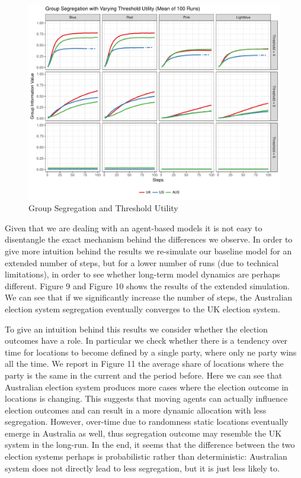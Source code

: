 \documentclass[12pt, a4paper]{article}
\begin{document}
	\begin{figure}[bp!]
		\centering
		\caption{Group Segregation and Threshold Utility}
		\includegraphics[scale=0.6]{./Plots/th_grp_ratios.pdf}
	\end{figure}
	
	Given that we are dealing with an agent-based models it is not easy to disentangle the exact mechanism behind the differences we observe. In order to give more intuition behind the results we re-simulate our baseline model for an extended number of steps, but for a lower number of runs (due to technical limitations), in order to see whether long-term model dynamics are perhaps different. Figure 9 and Figure 10 shows the results of the extended simulation. We can see that if we significantly increase the number of steps, the Australian election system segregation eventually converges to the UK election system. 
	
	To give an intuition behind this results we consider whether the election outcomes have a role. In particular we check whether there is a tendency over time for locations to become defined by a single party, where only ne party wins all the time. We report in Figure 11 the average share of locations where the party is the same in the current and the period before. Here we can see that Australian election system produces more cases where the election outcome in locations is changing. This suggests that moving agents can actually influence election outcomes and can result in a more dynamic allocation with less segregation. However, over-time due to randomness static locations eventually emerge in Australia as well, thus segregation outcome may resemble the UK system in the long-run. In the end, it seems that the difference between the two election systems perhaps is probabilistic rather than deterministic: Australian system does not directly lead to less segregation, but it is just less likely to. 
	
\end{document}
